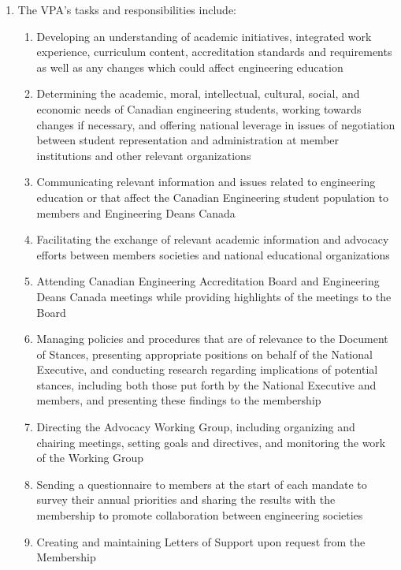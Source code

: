 \begin{enumerate}
 \item
  The VPA's tasks and responsibilities include:

  \begin{enumerate}
   \item
    Developing an understanding of academic initiatives, integrated work experience, curriculum content, accreditation standards and requirements as well as any changes which could affect engineering education
   \item
    Determining the academic, moral, intellectual, cultural, social, and economic needs of Canadian engineering students, working towards changes if necessary, and offering national leverage in issues of negotiation between student representation and administration at member institutions and other relevant organizations
   \item
    Communicating relevant information and issues related to engineering education or that affect the Canadian Engineering student population to members and Engineering Deans Canada
   \item
    Facilitating the exchange of relevant academic information and advocacy efforts between members societies and national educational organizations
   \item
    Attending Canadian Engineering Accreditation Board and Engineering Deans Canada meetings while providing highlights of the meetings to the Board
   \item
    Managing policies and procedures that are of relevance to the Document of Stances, presenting appropriate positions on behalf of the National Executive, and conducting research regarding implications of potential stances, including both those put forth by the National Executive and members, and presenting these findings to the membership
   \item
    Directing the Advocacy Working Group, including organizing and chairing meetings, setting goals and directives, and monitoring the work of the Working Group
   \item
    Sending a questionnaire to members at the start of each mandate to survey their annual priorities and sharing the results with the membership to promote collaboration between engineering societies
   \item
    Creating and maintaining Letters of Support upon request from the Membership

  \end{enumerate}
\end{enumerate}

